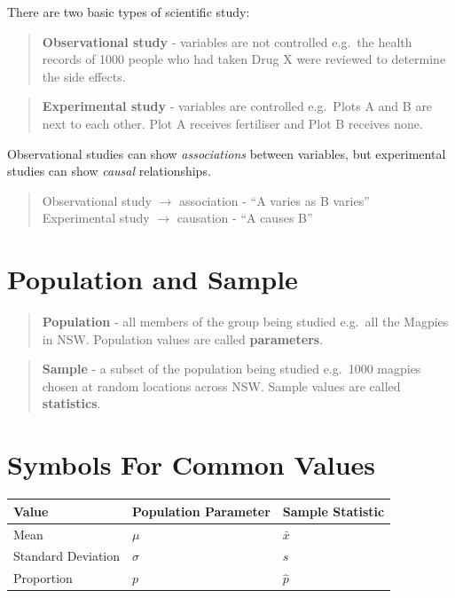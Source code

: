 \documentclass[
]{book}
\begin{document}
There are two basic types of scientific study:

\begin{quote}
\textbf{Observational study} - variables are not controlled e.g.~the health records of 1000 people who had taken Drug X were reviewed to determine the side effects.
\end{quote}

\begin{quote}
\textbf{Experimental study} - variables are controlled e.g.~Plots A and B are next to each other. Plot A receives fertiliser and Plot B receives none.
\end{quote}

Observational studies can show \emph{associations} between variables, but experimental studies can show \emph{causal} relationships.

\begin{quote}
Observational study \(\rightarrow\) association - ``A varies as B varies''\\
Experimental study \(\rightarrow\) causation - ``A causes B''
\end{quote}

\section{Population and Sample}\label{population-and-sample}

\begin{quote}
\textbf{Population} - all members of the group being studied e.g.~all the Magpies in NSW. Population values are called \textbf{parameters}.
\end{quote}

\begin{quote}
\textbf{Sample} - a subset of the population being studied e.g.~1000 magpies chosen at random locations across NSW. Sample values are called \textbf{statistics}.
\end{quote}

\section{Symbols For Common Values}\label{symbols-for-common-values}

\begin{longtable}[]{@{}lll@{}}
\toprule\noalign{}
Value & Population Parameter & Sample Statistic \\
\midrule\noalign{}
\endhead
\bottomrule\noalign{}
\endlastfoot
Mean & \(\mu\) & \(\bar{x}\) \\
Standard Deviation & \(\sigma\) & \(s\) \\
Proportion & \(p\) & \(\hat{p}\) \\
\end{longtable}
\end{document}
